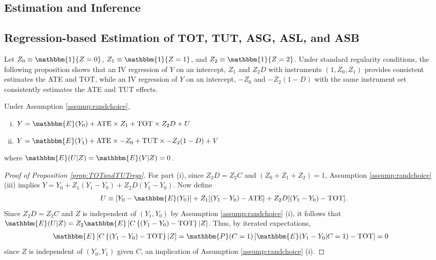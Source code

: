 \begin{appendix}
\section{Estimation and Inference} 
\label{sec:estimation_inference}

\subsection{Regression-based Estimation of TOT, TUT, ASG, ASL, and ASB}

Let $Z_0 \equiv \mathbbm{1}\{Z=0\}$, $Z_1 \equiv \mathbbm{1}\{Z=1\}$, and $Z_2 \equiv \mathbbm{1}\{Z=2\}$.
Under standard regularity conditions, the following proposition shows that an IV regression of $Y$ on an intercept, $Z_1$ and $Z_2 D$ with instruments $(1, Z_0, Z_1)$ provides consistent estimates the ATE and TOT, while an IV regression of $Y$ on an intercept, $-Z_0$ and $-Z_2(1-D)$ with the same instrument set consistently estimates the ATE and TUT effects.

\begin{prop} 
\label{prop:TOTandTUTregs}
Under Assumption \ref{assump:randchoice}, 
\begin{enumerate}[(i)] 
\item $Y = \mathbbm{E}(Y_0) + \text{ATE}\times Z_1 + \text{TOT} \times Z_2 D + U$
\item $Y = \mathbbm{E}(Y_1) + \text{ATE}\times -Z_0 + \text{TUT} \times -Z_2 (1 - D) + V$
\end{enumerate}
where $\mathbbm{E}(U|Z) = \mathbbm{E}(V|Z) = 0$.
\end{prop}

\begin{proof}[Proof of Proposition \ref{prop:TOTandTUTregs}]
For part (i), since $Z_2 D = Z_2 C$ and $(Z_0 + Z_1 + Z_2) = 1$, Assumption \ref{assump:randchoice} (iii) implies $Y= Y_0 + Z_1 (Y_1 - Y_0) + Z_2D(Y_1 - Y_0)$.
Now define 
\[
U \equiv [Y_0 - \mathbbm{E}(Y_0)] + Z_1[(Y_1 - Y_0) - \text{ATE}] + Z_2 D[(Y_1 - Y_0) - \text{TOT}].
\]
Since $Z_2 D = Z_2 C$ and $Z$ is independent of $(Y_1, Y_0)$ by Assumption \ref{assump:randchoice} (i), it follows that $\mathbbm{E}(U|Z) = Z_2 \mathbbm{E}\left[C\left\{(Y_1 - Y_0) - \text{TOT}\right\}|Z\right]$.
Thus, by iterated expectations,
\begin{align*}
\mathbbm{E}\left[C\left\{(Y_1 - Y_0) - \text{TOT}\right\}|Z\right] 
&= \mathbbm{P}(C=1)\left[\mathbbm{E}(Y_1 - Y_0|C=1) - \text{TOT} \right]=0
\end{align*}
since $Z$ is independent of $(Y_0, Y_1)$ given $C$, an implication of Assumption \ref{assump:randchoice} (i).


\end{proof}
\end{appendix}

